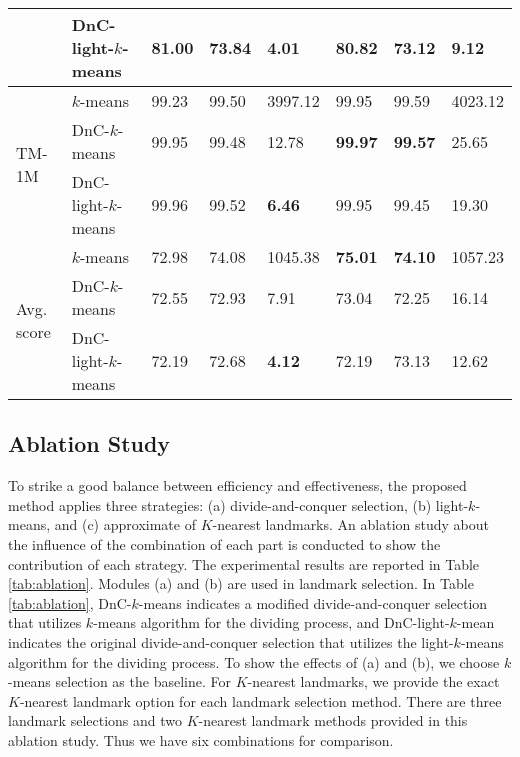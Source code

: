 \begin{table*}[]
\begin{tabular}{@{}llllllll@{}}
                                & DnC-light-$k$-means & {81.00}        & {73.84}          & \multicolumn{1}{l|}{{\textbf{4.01}}} & {80.82}          & {73.12}          & {9.12}    \\
    \midrule
    \multirow{3}{*}{TM-1M}      & $k$-means           & {99.23}        & {99.50}          & \multicolumn{1}{l|}{{3997.12}}       & 99.95            & 99.59            & 4023.12   \\
                                & DnC-$k$-means       & 99.95          & 99.48            & \multicolumn{1}{l|}{12.78}           & \textbf{99.97}   & \textbf{99.57}   & 25.65     \\
                                & DnC-light-$k$-means & {99.96}        & {99.52}          & \multicolumn{1}{l|}{{\textbf{6.46}}} & {99.95}          & {99.45}          & {19.30}   \\
    \midrule
    \midrule
    \multirow{3}{*}{Avg. score} & $k$-means           & {72.98}        & {{74.08}}        & \multicolumn{1}{l|}{{1045.38}}       & {\textbf{75.01}} & {\textbf{74.10}} & {1057.23} \\
                                & DnC-$k$-means       & {72.55}        & {72.93}          & \multicolumn{1}{l|}{{7.91}}          & {73.04}          & {72.25}          & {16.14}   \\
                                & DnC-light-$k$-means & {72.19}        & {72.68}          & \multicolumn{1}{l|}{{\textbf{4.12}}} & {72.19}          & {73.13}          & {{12.62}} \\
    \bottomrule
  \end{tabular}\end{table*}

\subsection{Ablation Study}

To strike a good balance between efficiency and effectiveness, the proposed method applies three strategies: (a) divide-and-conquer selection, (b) light-$k$-means, and (c) approximate of $K$-nearest landmarks.
An ablation study about the influence of the combination of each part is conducted to show the contribution of each strategy.
The experimental results are reported in Table \ref{tab:ablation}.
Modules (a) and (b) are used in landmark selection.
In Table \ref{tab:ablation}, DnC-$k$-means indicates a modified divide-and-conquer selection that utilizes $k$-means algorithm for the dividing process, and DnC-light-$k$-mean indicates the original divide-and-conquer selection that utilizes the light-$k$-means algorithm for the dividing process.
To show the effects of (a) and (b), we choose $k$-means selection as the baseline.
For $K$-nearest landmarks, we provide the exact $K$-nearest landmark option for each landmark selection method.
There are three landmark selections and two $K$-nearest landmark methods provided in this ablation study.
Thus we have six combinations for comparison. 

